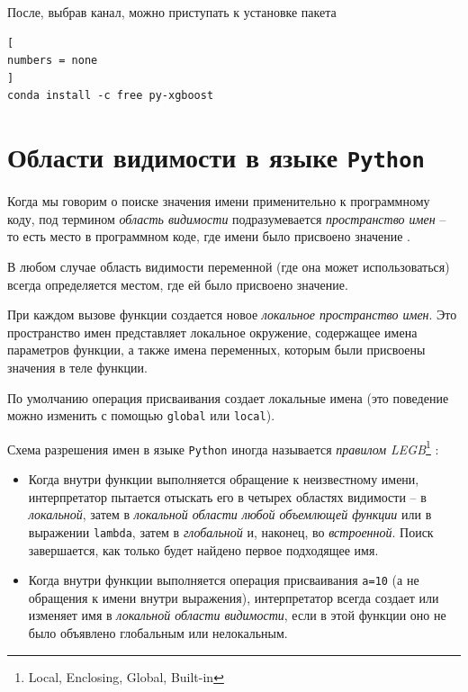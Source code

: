 \documentclass[%
	11pt,
	a4paper,
	utf8,
		]{article}
\begin{document}
После, выбрав канал, можно приступать к установке пакета

\begin{lstlisting}[
numbers = none
]
conda install -c free py-xgboost
\end{lstlisting}

\section{Области видимости в языке \texttt{Python}}

Когда мы говорим о поиске значения имени применительно к программному коду, под термином \emph{область видимости} подразумевается \emph{пространство имен} -- то есть место в программном коде, где имени было присвоено значение \cite{lutz:learningpython-2011}.

В любом случае область видимости переменной (где она может использоваться) всегда определяется местом, где ей было присвоено значение.


При каждом вызове функции создается новое \emph{локальное пространство имен}. Это пространство имен представляет локальное окружение, содержащее имена параметров функции, а также имена переменных, которым были присвоены значения в теле функции.

По умолчанию операция присваивания создает локальные имена (это поведение можно изменить с помощью \texttt{global} или \texttt{local}).

Схема разрешения имен в языке \texttt{Python} иногда называется \emph{правилом LEGB}\footnote{Local, Enclosing, Global, Built-in} \cite[стр.~477]{lutz:learningpython-2011}:

\begin{itemize}
	\item Когда внутри функции выполняется обращение к неизвестному имени, интерпретатор пытается отыскать его в четырех областях видимости -- в \emph{локальной}, затем в \emph{локальной области любой объемлющей функции} или в выражении \texttt{lambda}, затем в \emph{глобальной} и, наконец, во \emph{встроенной}. Поиск завершается, как только будет найдено первое подходящее имя.
	
	\item Когда внутри функции выполняется операция присваивания \lstinline{a=10} (а не обращения к имени внутри выражения), интерпретатор всегда создает или изменяет имя в \emph{локальной области видимости}, если в этой функции оно не было объявлено глобальным или нелокальным.
\end{itemize}
\end{document}
